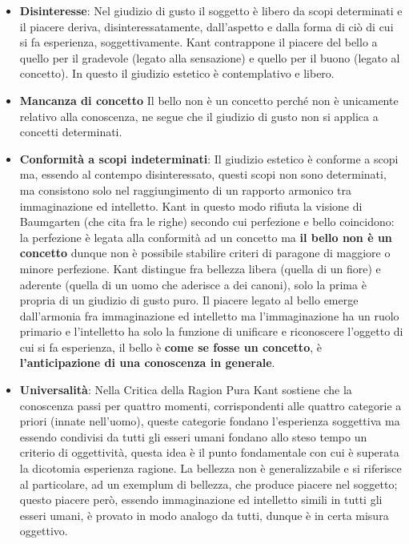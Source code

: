 \documentclass[10pt,a4paper]{article}
\begin{document}
\begin{itemize}
	\item \textbf{Disinteresse}: Nel giudizio di gusto il soggetto è libero da scopi determinati e il piacere deriva, disinteressatamente, dall'aspetto e dalla forma di ciò di cui si fa esperienza, soggettivamente. Kant contrappone il piacere del bello a quello per il gradevole (legato alla sensazione) e quello per il buono (legato al concetto). In questo il giudizio estetico è contemplativo e libero.
	\item \textbf{Mancanza di concetto} Il bello non è un concetto perché non è unicamente relativo alla conoscenza, ne segue che il giudizio di gusto non si applica a concetti determinati.
	\item \textbf{Conformità a scopi indeterminati}: Il giudizio estetico è conforme a scopi ma, essendo al contempo disinteressato, questi scopi non sono determinati, ma consistono solo nel raggiungimento di un rapporto armonico tra immaginazione ed intelletto. Kant in questo modo rifiuta la visione di Baumgarten (che cita fra le righe) secondo cui perfezione e bello coincidono: la perfezione è legata alla conformità ad un concetto ma \textbf{il bello non è un concetto} dunque non è possibile stabilire criteri di paragone di maggiore o minore perfezione. Kant distingue fra bellezza libera (quella di un fiore) e aderente (quella di un uomo che aderisce a dei canoni), solo la prima è propria di un giudizio di gusto puro.
	Il piacere legato al bello emerge dall'armonia fra immaginazione ed intelletto ma l'immaginazione ha un ruolo primario e l'intelletto ha solo la funzione di unificare e riconoscere l'oggetto di cui si fa esperienza, il bello è \textbf{come se fosse un concetto}, è \textbf{l'anticipazione di una conoscenza in generale}.
	\item \textbf{Universalità}: Nella Critica della Ragion Pura Kant sostiene che la conoscenza passi per quattro momenti, corrispondenti alle quattro categorie a priori (innate nell'uomo), queste categorie fondano l'esperienza soggettiva ma essendo condivisi da tutti gli esseri umani fondano allo steso tempo un criterio di oggettività, questa idea è il punto fondamentale con cui è superata la dicotomia esperienza ragione. La bellezza non è generalizzabile e si riferisce al particolare, ad un exemplum di bellezza, che produce piacere nel soggetto; questo piacere però, essendo immaginazione ed intelletto simili in tutti gli esseri umani, è provato in modo analogo da tutti, dunque è in certa misura oggettivo. 
\end{itemize}
\end{document}
